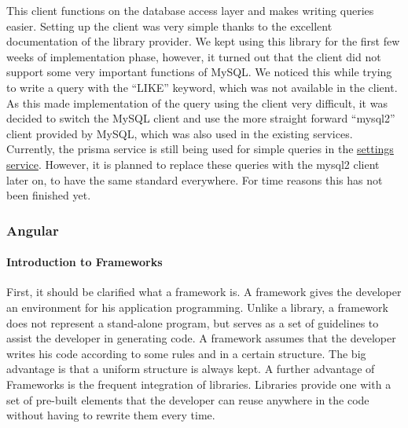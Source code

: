\begin{itemize}
        This client functions on the database access layer and makes writing queries easier.
        Setting up the client was very simple thanks to the excellent documentation of the library provider.
        We kept using this library for the first few weeks of implementation phase, however, it turned out that the
        client did not support some very important functions of MySQL.
        We noticed this while trying to write a query with the \enquote{LIKE} keyword, which was not available in the
        client.
        As this made implementation of the query using the client very difficult, it was decided to switch the MySQL
        client and use the more straight forward \enquote{mysql2} client provided by MySQL, which was also used in the
        existing services.
        Currently, the prisma service is still being used for simple queries in the
        \hyperref[subsubsec:settingsSer]{settings service}.
        However, it is planned to replace these queries with the mysql2 client later on, to have the same standard
        everywhere.
        For time reasons this has not been finished yet.
\end{itemize}

\subsubsection{Angular}

\paragraph{Introduction to Frameworks}
First, it should be clarified what a framework is. A framework gives the developer an environment for his application programming. Unlike a library, a framework does not represent a stand-alone program, but serves as a set of guidelines to assist the developer in generating code. A framework assumes that the developer writes his code according to some rules and in a certain structure. The big advantage is that a uniform structure is always kept. A further advantage of Frameworks is the frequent integration of libraries. Libraries provide one with a set of pre-built elements that the developer can reuse anywhere in the code without having to rewrite them every time.  

